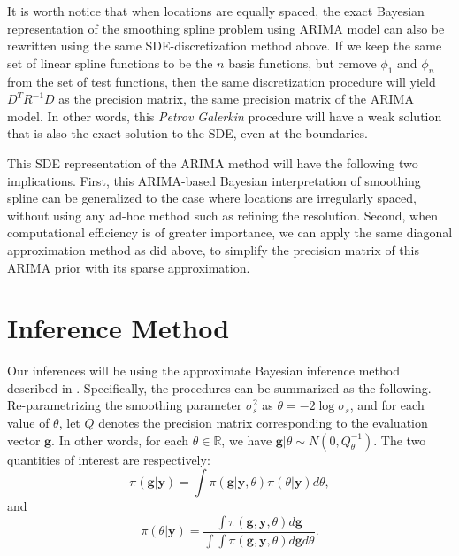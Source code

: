 \documentclass{article}
\begin{document}
It is worth notice that when locations are equally spaced, the exact Bayesian representation of the smoothing spline problem using ARIMA model can also be rewritten using the same SDE-discretization method above. If we keep the same set of linear spline functions to be the $n$ basis functions, but remove $\phi_1$ and $\phi_n$ from the set of test functions, then the same discretization procedure will yield $D^TR^{-1}D$ as the precision matrix, the same precision matrix of the ARIMA model. In other words, this \textit{Petrov Galerkin} procedure will have a weak solution that is also the exact solution to the SDE, even at the boundaries.

This SDE representation of the ARIMA method will have the following two implications. First, this ARIMA-based Bayesian interpretation of smoothing spline can be generalized to the case where locations are irregularly spaced, without using any ad-hoc method such as refining the resolution. Second, when computational efficiency is of greater importance, we can apply the same diagonal approximation method as \citep{rw2} did above, to simplify the precision matrix of this ARIMA prior with its sparse approximation.

\section{Inference Method}\label{inference}

Our inferences will be using the approximate Bayesian inference method described in \cite{noeps}. Specifically, the procedures can be summarized as the following. Re-parametrizing the smoothing parameter $\sigma_s^2$ as $\theta = -2\log \sigma_s$, and for each value of $\theta$,  let $Q$ denotes the precision matrix corresponding to the evaluation vector $\boldsymbol{g}$. In other words, for each $\theta \in \mathbb{R}$, we have $\boldsymbol{g}|\theta \sim N(0, Q_\theta^{-1})$. The two quantities of interest are respectively:
\begin{equation}\label{jointPoster}
\pi(\boldsymbol{g}|\boldsymbol{y}) = \int \pi(\boldsymbol{g}|\boldsymbol{y},\theta) \pi(\theta|\boldsymbol{y}) d\theta,
\end{equation}
and 
\begin{equation}\label{hyperPoster}
\pi(\theta|\boldsymbol{y}) = \frac{\int \pi(\boldsymbol{g}, \boldsymbol{y}, \theta) d\boldsymbol{g}} {\int \int \pi(\boldsymbol{g}, \boldsymbol{y}, \theta) d\boldsymbol{g} d\theta}.
\end{equation}
\end{document}
